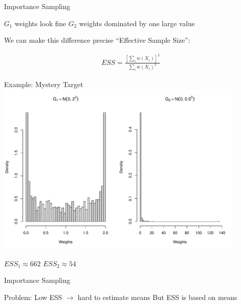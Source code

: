 \documentclass[14pt]{beamer}
\newcommand{\bE}{\mathbb{E}}
\begin{document}
\begin{frame}{Importance Sampling}
    \begin{outline}
        \1 $G_1$ weights look fine
        \1 $G_2$ weights dominated by one large value \newline

        \1 We can make this difference precise
        \1 ``Effective Sample Size'':
    \end{outline}
    \begin{gather*}
        ESS = \frac{\left[\sum_i w(X_i)\right]^2}{\sum_i w(X_i)^2}
    \end{gather*}
\end{frame}

\begin{frame}{Example: Mystery Target}
    \centering
    \includegraphics[height=0.7\textheight, width=0.9\textwidth, keepaspectratio]{Figures/Wt Hist.pdf} \newline
    \begin{outline}
        $ESS_1 \approx 662$ \hspace{2.5cm} $ESS_2 \approx 54$
    \end{outline}
\end{frame}

\begin{frame}{Importance Sampling}
    \begin{outline}
        \1 Problem: Low ESS $\rightarrow$ hard to estimate means \newline
        \1 But ESS is based on means
            \2 \citep{Cha18}
    \end{outline}
\end{frame}

\end{document}
